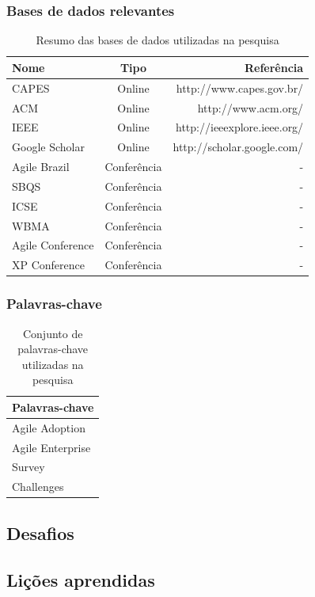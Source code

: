 \documentclass[a4paper,11pt]{article}
\begin{document}
		\subsubsection{Bases de dados relevantes}
			\begin{table}[h]
				\centering
				\begin{tabular}{ | l | c | r | } \hline \textbf{Nome} & \textbf{Tipo} & \textbf{Referência} \\ \hline
					CAPES & Online & http://www.capes.gov.br/ \\ \hline
					ACM & Online & http://www.acm.org/ \\ \hline
					IEEE & Online & http://ieeexplore.ieee.org/ \\ \hline
					Google Scholar & Online & http://scholar.google.com/ \\ \hline
					Agile Brazil & Conferência & - \\ \hline
					SBQS & Conferência & - \\ \hline
					ICSE & Conferência & - \\ \hline
					WBMA & Conferência & - \\ \hline
					Agile Conference & Conferência & - \\ \hline
					XP Conference & Conferência & - \\ \hline
				\end{tabular}
				\caption{Resumo das bases de dados utilizadas na pesquisa}
				\label{tab:basesDeDados}
			\end{table}
		\subsubsection{Palavras-chave}
			\begin{table}[h]
				\centering
				\begin{tabular}{ | l | } \hline \textbf{Palavras-chave} \\ \hline
					Agile Adoption \\ \hline
					Agile Enterprise \\ \hline
					Survey \\ \hline
					Challenges \\ \hline
				\end{tabular}
				\caption{Conjunto de palavras-chave utilizadas na pesquisa}
				\label{tab:palavrasChave}
			\end{table}
	\subsection{Desafios}
	\subsection{Lições aprendidas}



\end{document}
